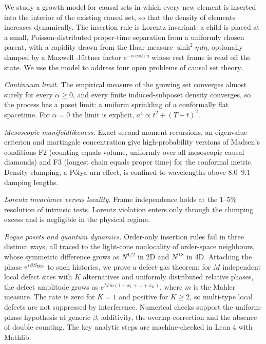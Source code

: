 We study a growth model for causal sets in which every new element is
inserted into the interior of the existing causal set, so that the
density of elements increases dynamically. The insertion rule is Lorentz
invariant: a child is placed at a small, Poisson-distributed proper-time
separation from a uniformly chosen parent, with a rapidity drawn from
the Haar measure \(\sinh^2\eta\,d\eta\), optionally damped by a
Maxwell--Jüttner factor \(e^{-\alpha\cosh\eta}\) whose rest frame is
read off the state. We use the model to address four open problems of
causal set theory.

\emph{Continuum limit.} The empirical measure of the growing set
converges almost surely for every \(\alpha\ge 0\), and every finite
induced-subposet density converges, so the process has a poset limit: a
uniform sprinkling of a conformally flat spacetime. For \(\alpha=0\) the
limit is explicit, \(a^4\propto t^2+(T-t)^2\).

\emph{Mesoscopic manifoldlikeness.} Exact second-moment recursions, an
eigenvalue criterion and martingale concentration give high-probability
versions of Madsen's conditions F2 (counting equals volume, uniformly
over all mesoscopic causal diamonds) and F3 (longest chain equals proper
time) for the conformal metric. Density clumping, a Pólya-urn effect, is
confined to wavelengths above \(8.0\)--\(9.1\) damping lengths.

\emph{Lorentz invariance versus locality.} Frame independence holds at
the 1--5\% resolution of intrinsic tests. Lorentz violation enters only
through the clumping excess and is negligible in the physical regime.

\emph{Rogue posets and quantum dynamics.} Order-only insertion rules
fail in three distinct ways, all traced to the light-cone nonlocality of
order-space neighbours, whose symmetric difference grows as \(N^{1/2}\)
in 2D and \(N^{0.8}\) in 4D. Attaching the phase
\(e^{i\beta S_{\rm BD}}\) to such histories, we prove a defect-gas
theorem: for \(M\) independent local defect sites with \(K\)
alternatives and uniformly distributed relative phases, the defect
amplitude grows as \(e^{M\,m(1+x_1+\dots+x_K)}\), where \(m\) is the
Mahler measure. The rate is zero for \(K=1\) and positive for
\(K\ge 2\), so multi-type local defects are not suppressed by
interference. Numerical checks support the uniform-phase hypothesis at
generic \(\beta\), additivity, the overlap correction and the absence of
double counting. The key analytic steps are machine-checked in Lean 4
with Mathlib.
